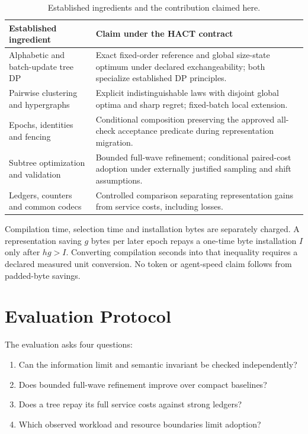 \documentclass[preprint,12pt]{elsarticle}
\theoremstyle{definition}\newtheorem{definition}[theorem]{Definition}
\begin{document}
\begin{table}[t]\centering\footnotesize
\caption{Established ingredients and the contribution claimed here.}
\label{tab:novelty}
\begin{tabularx}{\columnwidth}{@{}p{}X@{}}\toprule
Established ingredient & Claim under the HACT contract\\\midrule
Alphabetic and batch-update tree DP & Exact fixed-order reference and global size-state optimum under declared exchangeability; both specialize established DP principles.\\
Pairwise clustering and hypergraphs & Explicit indistinguishable laws with disjoint global optima and sharp regret; fixed-batch local extension.\\
Epochs, identities and fencing & Conditional composition preserving the approved all-check acceptance predicate during representation migration.\\
Subtree optimization and validation & Bounded full-wave refinement; conditional paired-cost adoption under externally justified sampling and shift assumptions.\\
Ledgers, counters and common codecs & Controlled comparison separating representation gains from service costs, including losses.\\\bottomrule
\end{tabularx}
\end{table}

Compilation time, selection time and installation bytes are separately
charged. A representation saving $g$ bytes per later epoch repays a one-time
byte installation $I$ only after $h g>I$. Converting compilation seconds into
that inequality requires a declared measured unit conversion. No token
or agent-speed claim follows from padded-byte savings.

\section{Evaluation Protocol}\label{sec:jevaluation}
The evaluation asks four questions:
\begin{enumerate}
\item Can the information limit and semantic invariant be checked independently?
\item Does bounded full-wave refinement improve over compact baselines?
\item Does a tree repay its full service costs against strong ledgers?
\item Which observed workload and resource boundaries limit adoption?
\end{enumerate}
\end{document}
